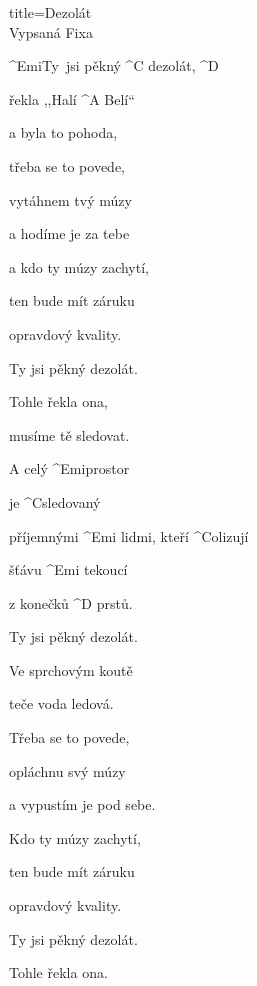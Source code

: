 \begin{song}{title=\predtitle\centering Dezolát\\\large Vypsaná Fixa \vspace*{-0.3cm}}  %
\begin{centerjustified}
\nejvetsi

\begin{varwidth}[t]{0.48\textwidth}\setlength{\parindent}{0.45cm}  %

\sloka
	^{Emi\z}Ty~jsi pěkný ^{C \z}dezolát, ^{D}
	
	řekla ,,Halí ^{A \z}Belí`` 
	
	a byla to pohoda,
	
	třeba se to povede, 
	
	vytáhnem tvý múzy 
	
	a hodíme je za tebe 
	
	a kdo ty múzy zachytí, 

	ten bude mít záruku 
	
	opravdový kvality.
	
	Ty jsi pěkný dezolát.
	
	Tohle řekla ona, 
	
	musíme tě sledovat.
	
	A celý ^{Emi}prostor 
	
	je ^{\z C}sledovaný
	
	příjemnými ^{Emi \z}lidmi, kteří ^{\z C}olizují 
	
	šťávu ^{Emi \z}tekoucí 
	
	z konečků ^{D \z}prstů.
	
\sloka
	Ty jsi pěkný dezolát.
	
	Ve sprchovým koutě 
	
	teče voda ledová.
	
	Třeba se to povede,
	
	opláchnu svý múzy 
	
	a vypustím je pod sebe. 
	
	Kdo ty múzy zachytí, 
	
	ten bude mít záruku 
	
	opravdový kvality. 
	
	Ty jsi pěkný dezolát. 
	
	Tohle řekla ona.
	
	
\end{varwidth}\mezisloupci\begin{varwidth}[t]{0.48\textwidth}\setlength{\parindent}{0.45cm}%


\end{varwidth}
\end{centerjustified}
\end{song}
